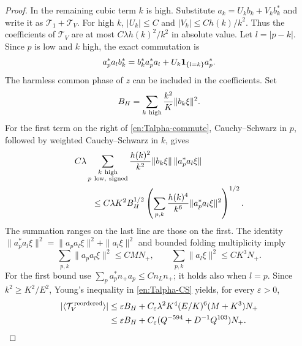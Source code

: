 \begin{proof}
In the remaining cubic term $k$ is high.  Substitute
$a_k=U_kb_k+V_kb_k^*$ and write it as $\mathcal T_1+\mathcal T_V$.
For high $k$, $|U_k|\le C$ and
$|V_k|\le Ch(k)/k^2$.  Thus the coefficients of $\mathcal T_V$
are at most $C\lambda h(k)^2/k^2$ in absolute value.
Let $l=|p-k|$.  Since $p$ is low and $k$ high, the exact commutation is
\begin{equation}\label{en:Talpha-commute}
 a_p^*a_l b_k^*=b_k^*a_p^*a_l
                         +U_k\mathbf 1_{\{l=k\}}a_p^* .
\end{equation}
The harmless common phase of $z$ can be included in the coefficients.
Set
\[
 B_H=\sum_{k\ {\rm high}}\frac{k^2}{K}\|b_k\xi\|^2.
\]
For the first term on the right of \eqref{en:Talpha-commute},
Cauchy--Schwarz in $p$, followed by weighted Cauchy--Schwarz in $k$,
gives
\begin{align}
 &C\lambda\sum_{\substack{k\ {\rm high}\\p\ {\rm low,\ signed}}}
       \frac{h(k)^2}{k^2}\|b_k\xi\|\,\|a_p^*a_l\xi\|\nonumber\\
 &\qquad\le
 C\lambda K^2 B_H^{1/2}
  \left(\sum_{p,k}\frac{h(k)^4}{k^6}
                  \|a_p^*a_l\xi\|^2\right)^{1/2}.
                                                        \label{en:Talpha-CS}
\end{align}
The summation ranges on the last line are those on the first.
The identity
$\|a_p^*a_l\xi\|^2=\|a_pa_l\xi\|^2+\|a_l\xi\|^2$
and bounded folding multiplicity imply
\[
 \sum_{p,k}\|a_pa_l\xi\|^2\le CMN_+,\qquad
 \sum_{p,k}\|a_l\xi\|^2\le CK^3N_+.
\]
For the first bound use
$\sum_p a_p^*n_+a_p\le Cn_Ln_+$; it holds also when $l=p$.
Since $k^2\ge K^2/E^2$, Young's inequality in
\eqref{en:Talpha-CS} yields, for every $\varepsilon>0$,
\begin{align}
 |\langle\mathcal T_V^{\,\rm reordered}\rangle|
 &\le\varepsilon B_H+
 C_\varepsilon\lambda^2K^4(E/K)^6(M+K^3)N_+\nonumber\\
 &\le\varepsilon B_H+
 C_\varepsilon(Q^{-594}+D^{-1}Q^{103})N_+.
                                                        \label{en:Talpha-main-bound}
\end{align}


\end{proof}

